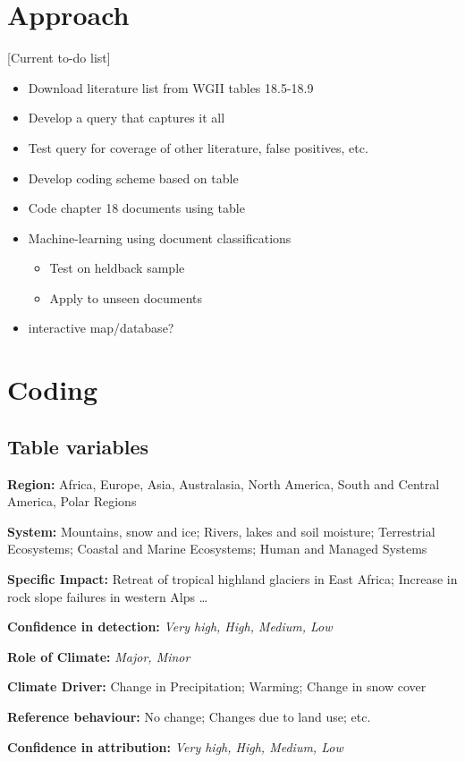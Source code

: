 \documentclass{article}
\begin{document}
	\section{Approach}
	
	[Current to-do list]
	
	\begin{itemize}
		\item Download literature list from WGII tables 18.5-18.9
		\item Develop a query that captures it all
		\item Test query for coverage of other literature, false positives, etc.
		\item Develop coding scheme based on table
		\item Code chapter 18 documents using table
		\item Machine-learning using document classifications
		\begin{itemize}
			\item Test on heldback sample 
			\item Apply to unseen documents
		\end{itemize}
		\item interactive map/database?
	
		
	\end{itemize}
	

	\section{Coding}
	
	\subsection{Table variables}
	
	\textbf{Region:} Africa, Europe, Asia, Australasia, North America, South and Central America, Polar Regions 
	
	\noindent\textbf{System:} Mountains, snow and ice; Rivers, lakes and soil moisture; Terrestrial Ecosystems; Coastal and Marine Ecosystems; Human and Managed Systems
	
	\noindent\textbf{Specific Impact:} Retreat of tropical highland glaciers in East Africa; Increase in rock slope failures in western Alps \ldots	{}
	
	\noindent\textbf{Confidence in detection:} \textit{Very high, High, Medium, Low}
	
	\noindent\textbf{Role of Climate:} \textit{Major, Minor}
	
	\noindent\textbf{Climate Driver:} Change in Precipitation; Warming; Change in snow cover
	
	\noindent\textbf{Reference behaviour:} No change; Changes due to land use; etc.
	
	\noindent\textbf{Confidence in attribution:} \textit{Very high, High, Medium, Low}
	


		
\end{document}
